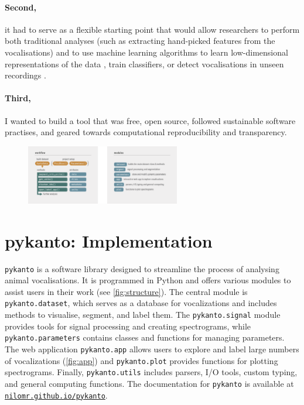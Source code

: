 \paragraph{Second,} it had to serve as a flexible starting point that would allow researchers to perform both traditional analyses (such as extracting hand-picked
features from the vocalisations) and to use machine learning algorithms to learn
low-dimensional representations of the data \parencite{goffinet2021, kollmorgen2020,
morfi2021, sainburg2020}, train classifiers, or detect vocalisations in unseen
recordings \parencite{cohen2022, kahl2021, stowell2014}.

\paragraph{Third,} I wanted to build a tool that was free, open source, followed
sustainable software practises, and geared towards computational
reproducibility and transparency.

\begin{figure}
    \centering
    \includegraphics[width=0.6\textwidth]{figures/chapter_2/fig2.pdf}
    \label{fig:structure}
\end{figure}

\section{pykanto: Implementation}

\texttt{pykanto} is a software library designed to streamline the process of
analysing animal vocalisations. It is programmed in Python and offers various
modules to assist users in their work (see \autoref{fig:structure}). The central module is
\texttt{pykanto.dataset}, which serves as a database for vocalizations and
includes methods to visualise, segment, and label them. The \texttt{pykanto.signal} module provides tools for
signal processing and creating spectrograms, while \texttt{pykanto.parameters}
contains classes and functions for managing parameters. The web application
\texttt{pykanto.app} allows users to explore and label large numbers of
vocalizations (\autoref{fig:app}) and \texttt{pykanto.plot} provides functions for
plotting spectrograms. Finally, \texttt{pykanto.utils} includes parsers, I/O
tools, custom typing, and general computing functions. The documentation for
\texttt{pykanto} is available at
\href{https://nilomr.github.io/pykanto}{\nolinkurl{nilomr.github.io/pykanto}}.

